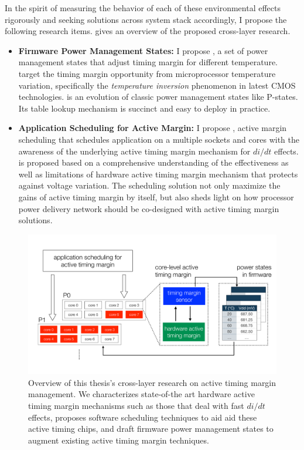 In the spirit of measuring the behavior of each of these environmental effects rigorously and seeking solutions across system stack accordingly, I propose the following research items.  gives an overview of the proposed cross-layer research.

\begin{itemize}
\item \textbf{Firmware Power Management States:} I propose \tistate, a set of power management states that adjust timing margin for different temperature. \tistates target the timing margin opportunity from microprocessor temperature variation, specifically the \textit{temperature inversion} phenomenon in latest CMOS technologies. \tistate is an evolution of classic power management states like P-states. Its table lookup mechanism is succinct and easy to deploy in practice.

\item \textbf{Application Scheduling for Active Margin:} I propose \ams, active margin scheduling that schedules application on a multiple sockets and cores with the awareness of the underlying active timing margin mechanism for $di/dt$ effects. \ams is proposed based on a comprehensive understanding of the effectiveness as well as limitations of hardware active timing margin mechanism that protects against voltage variation. The scheduling solution not only maximize the gains of active timing margin by itself, but also sheds light on how processor power delivery network should be co-designed with active timing margin solutions.

\end{itemize}

\begin{figure}[t]
  \centering
  \includegraphics[trim=0 0 0 0, clip, width=\columnwidth]{graphs/proposal-overview.pdf}
  \caption{Overview of this thesis's cross-layer research on active timing margin management. We characterizes state-of-the art hardware active timing margin mechanisms such as those that deal with fast $di/dt$ effects, proposes software scheduling techniques to aid aid these active timing chips, and draft firmware power management states to augment existing active timing margin techniques.}
  \label{fig:framework}
\end{figure}

